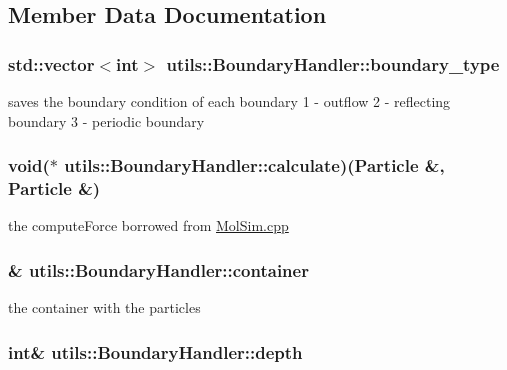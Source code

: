 \subsection{Member Data Documentation}
\hypertarget{classutils_1_1BoundaryHandler_a8b4bd74821356f9607a38bb5496ac0d7}{
\subsubsection[{boundary\-\_\-type}]{\setlength{\rightskip}{0pt plus 5cm}std\-::vector$<$int$>$ utils\-::\-Boundary\-Handler\-::boundary\-\_\-type\hspace{0.3cm}{\ttfamily [private]}}}\label{classutils_1_1BoundaryHandler_a8b4bd74821356f9607a38bb5496ac0d7}
saves the boundary condition of each boundary 1 -\/ outflow 2 -\/ reflecting boundary 3 -\/ periodic boundary \hypertarget{classutils_1_1BoundaryHandler_ade349a546fc40f1eb2cc3753ac3536b9}{
\subsubsection[{calculate}]{\setlength{\rightskip}{0pt plus 5cm}void($\ast$ utils\-::\-Boundary\-Handler\-::calculate)({\bf Particle} \&, {\bf Particle} \&)\hspace{0.3cm}{\ttfamily [private]}}}\label{classutils_1_1BoundaryHandler_ade349a546fc40f1eb2cc3753ac3536b9}
the compute\-Force borrowed from \hyperlink{MolSim_8cpp}{Mol\-Sim.\-cpp} \hypertarget{classutils_1_1BoundaryHandler_a6c7c960f3bc85563c81e420b295e983a}{
\subsubsection[{container}]{\& utils\-::\-Boundary\-Handler\-::container\hspace{0.3cm}{\ttfamily [private]}}}\label{classutils_1_1BoundaryHandler_a6c7c960f3bc85563c81e420b295e983a}
the container with the particles \hypertarget{classutils_1_1BoundaryHandler_a0d89c9f37fd21c12dea330cdd52ea79b}{
\subsubsection[{depth}]{\setlength{\rightskip}{0pt plus 5cm}int\& utils\-::\-Boundary\-Handler\-::depth\hspace{0.3cm}{\ttfamily [private]}}}\label{classutils_1_1BoundaryHandler_a0d89c9f37fd21c12dea330cdd52ea79b}
